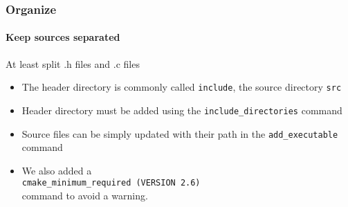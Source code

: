 \begin{frame}
\frametitle{Organize}
\framesubtitle{Keep sources separated}

\begin{block}{At least split .h files and .c files}
\begin{itemize}
\item The header directory is commonly called \texttt{include}, the source directory \texttt{src}
\item Header directory must be added using the \texttt{include\_directories} command
\item Source files can be simply updated with their path in the \texttt{add\_executable} command
\item We also added a \\
\texttt{cmake\_minimum\_required (VERSION 2.6)} \\

command to avoid a warning.

\end{itemize}
\end{block}

\end{frame}